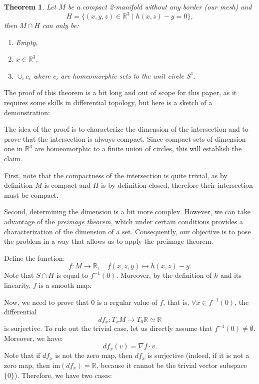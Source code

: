 \documentclass{article}
\newtheorem{theorem}{Theorem}
\begin{document}
\begin{theorem}
	Let $M$ be a compact 2-manifold without any border (our mesh) and
	\begin{equation}
		H=\{(x,y,z) \in \mathbb{R}^3 \mid h(x,z)-y=0\},
	\end{equation}
	then $M \cap H$ can only be:
	\begin{enumerate}
		\item Empty,
		\item $x \in \mathbb{R}^3$,
		\item $\cup_i c_i$ where $c_i$ are homeomorphic sets to the unit circle $S^1$.
	\end{enumerate}
\end{theorem}

The proof of this theorem is a bit long and out of scope for this paper, as it requires some skills in differential topology, but here is a sketch of a demonstration:

The idea of the proof is to characterize the dimension of the intersection and to prove that the intersection is always compact. Since compact sets of dimension one in $\mathbb{R}^3$ are homeomorphic to a finite union of circles, this will establish the claim.

First, note that the compactness of the intersection is quite trivial, as by definition $M$ is compact and $H$ is by definition closed, therefore their intersection must be compact.

Second, determining the dimension is a bit more complex. However, we can take advantage of the \textit{\href{https://en.wikipedia.org/wiki/Preimage_theorem}{preimage theorem}}, which under certain conditions provides a characterization of the dimension of a set. Consequently, our objective is to pose the problem in a way that allows us to apply the preimage theorem.

Define the function:
\begin{equation}
	f: M \to \mathbb{R}, \quad f(x,z,y) \mapsto h(x,z)-y.
\end{equation}
Note that $S \cap H$ is equal to $f^{-1}(0)$. Moreover, by the definition of $h$ and its linearity, $f$ is a smooth map.

Now, we need to prove that $0$ is a regular value of $f$, that is, $\forall x \in f^{-1}(0)$, the differential
\begin{equation}
	df_x : T_x M \to T_0 \mathbb{R} \simeq \mathbb{R}
\end{equation}
is surjective. To rule out the trivial case, let us directly assume that $f^{-1}(0) \neq \emptyset$. Moreover, we have:
\begin{equation}
	df_x(v) = \nabla f \cdot v.
\end{equation}
Note that if $df_x$ is not the zero map, then $df_x$ is surjective (indeed, if it is not a zero map, then $\text{im}(df_x) = \mathbb{R}$, because it cannot be the trivial vector subspace $\{0\}$). Therefore, we have two cases:
\end{document}
